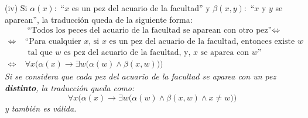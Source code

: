 \documentclass[letterpaper,DIV=14,headsepline,12pt]{scrartcl}
\makeatletter
\newenvironment{solu}[1][]{%
        \par\pushQED{\hfill \lozenge}%
        \normalfont\topsep6pt \partopsep0pt %
        \trivlist
        \item[\hskip\labelsep
                \textbf{\textit{Solución.}}%
        ]#1
        }{%
        \popQED\endtrivlist\@endpefalse
    }
\makeatother
\begin{document}
\begin{solu}
        (iv) Si $\alpha(x):$ ``$x$ es un pez del acuario de la facultad'' y $\beta(x,y):$ ``$x$ y $y$ se aparean'', la traducción queda de la siguiente forma:
        \begin{align*}
            & \; \text{``Todos los peces del acuario de la facultad se aparean con otro pez''} \Leftrightarrow \\
            \Leftrightarrow \; & \text{``Para cualquier } x \text{, si } x \text{ es un pez del acuario de la facultad, entonces existe } w \\
            \phantom{\Leftrightarrow \;} & \text{ tal que } w \text{ es pez del acuario de la facultad, y, } x \text{ se aparea con } w \text{''} \\
            \Leftrightarrow \; & \forall x \Big( \alpha(x) \to \exists w \big( \alpha(w) \land \beta(x,w) \big) \Big)
        \end{align*}
        \textit{Si se considera que cada pez del acuario de la facultad se aparea con un pez \textbf{distinto}, la traducción queda como:}
        \[ \forall x \Big( \alpha(x) \to \exists w \big( \alpha(w) \land \beta(x,w) \land x \neq w \big) \Big) \]
        \textit{y también es válida.}
    \end{solu}
\end{document}
